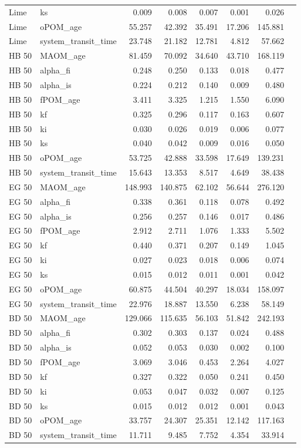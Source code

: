\documentclass[preprint,12pt]{elsarticle}
\begin{document}
\begin{landscape}
\begin{longtable}{llrrrrrr}
Lime & ks & 0.009 & 0.008 & 0.007 & 0.001 & 0.026 \\
Lime & oPOM\_age & 55.257 & 42.392 & 35.491 & 17.206 & 145.881 \\
Lime & system\_transit\_time & 23.748 & 21.182 & 12.781 & 4.812 & 57.662 \\
HB 50 & MAOM\_age & 81.459 & 70.092 & 34.640 & 43.710 & 168.119 \\
HB 50 & alpha\_fi & 0.248 & 0.250 & 0.133 & 0.018 & 0.477 \\
HB 50 & alpha\_is & 0.224 & 0.212 & 0.140 & 0.009 & 0.480 \\
HB 50 & fPOM\_age & 3.411 & 3.325 & 1.215 & 1.550 & 6.090 \\
HB 50 & kf & 0.325 & 0.296 & 0.117 & 0.163 & 0.607 \\
HB 50 & ki & 0.030 & 0.026 & 0.019 & 0.006 & 0.077 \\
HB 50 & ks & 0.040 & 0.042 & 0.009 & 0.016 & 0.050 \\
HB 50 & oPOM\_age & 53.725 & 42.888 & 33.598 & 17.649 & 139.231 \\
HB 50 & system\_transit\_time & 15.643 & 13.353 & 8.517 & 4.649 & 38.438 \\
EG 50 & MAOM\_age & 148.993 & 140.875 & 62.102 & 56.644 & 276.120 \\
EG 50 & alpha\_fi & 0.338 & 0.361 & 0.118 & 0.078 & 0.492 \\
EG 50 & alpha\_is & 0.256 & 0.257 & 0.146 & 0.017 & 0.486 \\
EG 50 & fPOM\_age & 2.912 & 2.711 & 1.076 & 1.333 & 5.502 \\
EG 50 & kf & 0.440 & 0.371 & 0.207 & 0.149 & 1.045 \\
EG 50 & ki & 0.027 & 0.023 & 0.018 & 0.006 & 0.074 \\
EG 50 & ks & 0.015 & 0.012 & 0.011 & 0.001 & 0.042 \\
EG 50 & oPOM\_age & 60.875 & 44.504 & 40.297 & 18.034 & 158.097 \\
EG 50 & system\_transit\_time & 22.976 & 18.887 & 13.550 & 6.238 & 58.149 \\
BD 50 & MAOM\_age & 129.066 & 115.635 & 56.103 & 51.842 & 242.193 \\
BD 50 & alpha\_fi & 0.302 & 0.303 & 0.137 & 0.024 & 0.488 \\
BD 50 & alpha\_is & 0.052 & 0.053 & 0.030 & 0.002 & 0.100 \\
BD 50 & fPOM\_age & 3.069 & 3.046 & 0.453 & 2.264 & 4.027 \\
BD 50 & kf & 0.327 & 0.322 & 0.050 & 0.241 & 0.450 \\
BD 50 & ki & 0.053 & 0.047 & 0.032 & 0.007 & 0.125 \\
BD 50 & ks & 0.015 & 0.012 & 0.012 & 0.001 & 0.043 \\
BD 50 & oPOM\_age & 33.757 & 24.307 & 25.351 & 12.142 & 117.163 \\
BD 50 & system\_transit\_time & 11.711 & 9.485 & 7.752 & 4.354 & 33.914 \\
\end{longtable}


\end{landscape}
\end{document}
